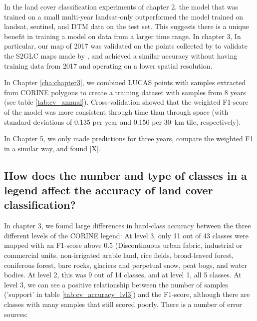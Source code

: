         In the land cover classification experiments of chapter 2, the model that was trained on a small multi-year landsat-only outperformed the model trained on landsat, sentinel, and DTM data on the test set. This suggests there is a unique benefit in training a model on data from a larger time range.
        In chapter 3, 
         In particular, our map of 2017 was validated on the points collected by \citep{jenerowicz2021validation} to validate the S2GLC maps made by \citet{malinowski2020automated}, and achieved a similar accuracy without having training data from 2017 and operating on a lower spatial resolution.
        
        In Chapter \ref{cha:chapter3}, we combined LUCAS points with samples extracted from CORINE polygons to create a training dataset with samples from 8 years (see table \ref{tab:cv_annual}). Cross-validation showed that the weighted F1-score of the model was more consistent through time than through space (with standard deviations of 0.135 per year and 0.150 per 30~km tile, respectively). 

        In Chapter 5, we only made predictions for three years, compare the weighted F1 in a similar way, and found [X].
    
    \subsection{How does the number and type of classes in a legend affect the accuracy of land cover classification?}
    \label{syn:rq3}

        In chapter 3, we found large differences in hard-class accuracy between the three different levels of the CORINE legend: At level 3, only 11 out of 43 classes were mapped with an F1-score above 0.5 (Discontinuous urban fabric, industrial or commercial units, non-irrigated arable land, rice fields, broad-leaved forest, coniferous forest, bare rocks, glaciers and perpetual snow, peat bogs, and water bodies. At level 2, this was 9 out of 14 classes, and at level 1, all 5 classes. At level 3, we can see a positive relationship between the number of samples ('support' in table \ref{tab:cv_accuracy_lvl3}) and the F1-score, although there are classes with many samples that still scored poorly. There is a number of error sources: 

